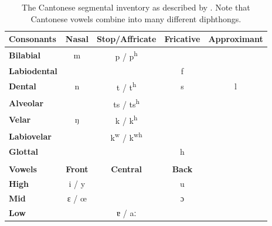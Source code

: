 \begin{table}[htbp]
    \caption{The Cantonese segmental inventory as described by \citet{matthews_2013_cantonese}. Note that Cantonese vowels combine into many different diphthongs.}
    \label{ch3:tab:cantoneseinventory}
    \centering
    \begin{tabular}{lcccc}
    \toprule
    \textbf{Consonants}  & \textbf{Nasal} & \textbf{Stop/Affricate} & \textbf{Fricative} & \textbf{Approximant} \\
    \midrule
    \textbf{Bilabial}    & m              & p / p\textsuperscript{h}                     &                   &                 \\
    \textbf{Labiodental} &                &                                              & f                 &                 \\
    \textbf{Dental}      & n              & t / t\textsuperscript{h}                     & s                 & l               \\
    \textbf{Alveolar}    &                & ts / ts\textsuperscript{h}                   &                   &                 \\
    \textbf{Velar}       & {\ipafont ŋ}   & k / k\textsuperscript{h}                     &                   &                 \\
    \textbf{Labiovelar}  &                & k\textsuperscript{w} / k\textsuperscript{wh} &                   &                 \\
    \textbf{Glottal}     &                &                                              & h                 &                 \\
                         &                &                                              &                   &                 \\
    \midrule
    \textbf{Vowels}      & \textbf{Front} & \textbf{Central}                             & \textbf{Back}  &                 \\
    \midrule 
    \textbf{High}        & i / y                       &                   & u             & \\
    \textbf{Mid}         & {\ipafont ɛ / œ}            &                   & {\ipafont ɔ } & \\
    \textbf{Low}         &                             & {\ipafont ɐ / aː} &                & \\
    \bottomrule
    \end{tabular}
\end{table}
    
